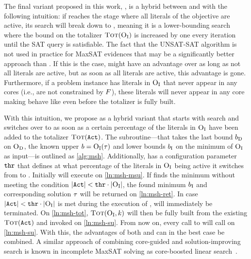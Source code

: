 The final variant proposed in this work, \msh{}, is a hybrid between \msu{} and \satunsat{} with the following intuition:
if \msu{}  reaches the stage where all literals of the objective are active, its search will break down to \unsatsat{}, meaning it is a lower-bounding search where the bound on the totalizer $\textsc{Tot}(\textsc{O}_{\text{I}})$ is increased by one every iteration until the SAT query is satisfiable.
The fact that the UNSAT-SAT algorithm is not used in practice for MaxSAT evidences that \satunsat{} may be a significantly better approach than \unsatsat{}.
If this is the case, \msu{} might have an advantage over \satunsat{} as long as not all literals are active, but as soon as all literals are active, this advantage is gone.
Furthermore, if a problem instance has literals in $\textsc{O}_{\text{I}}$ that never appear in any cores (i.e., are not constrained by $F$), these literals will never appear in any core making \msu{} behave like \unsatsat{} even before the totalizer is fully built.

With this intuition, we propose \msh{} as a hybrid variant that starts with \msu{} search and switches over to \satunsat{} as soon as a certain percentage of the literals in $\textsc{O}_{\text{I}}$ have been added to the totalizer $\textsc{Tot}(\texttt{Act})$.
The subroutine---that takes the last bound $b_{\text{D}}$ on $\textsc{O}_{\text{D}}$, the known upper $b=\textsc{O}_{\text{I}}(\tau)$ and lower bounds $b_{\text{I}}$ on the minimum of $\textsc{O}_{\text{I}}$ as input---is outlined as \cref{alg:msh}.
Additionally, \msh{} has a configuration parameter $\texttt{thr}$ that defines at what percentage of the literals in $\textsc{O}_{\text{I}}$ being active it switches from \msu{} to \satunsat{}.
Initially \msh{} will execute \msu{} on \cref{ln:msh-msu}.
If \msu{} finds the minimum without meeting the condition $|\texttt{Act}| < \texttt{thr} \cdot |\textsc{O}_{\text{I}}|$, the found minimum $b_{\text{I}}$ and corresponding solution $\tau$ will be returned on \cref{ln:msh-ret}.
In case $|\texttt{Act}| < \texttt{thr} \cdot |\textsc{O}_{\text{I}}|$ is met during the execution of \msu{}, \msu{} will immediately be terminated.
On \cref{ln:msh-tot}, $\textsc{Tot}(\textsc{O}_{\text{I}},k)$ will then be fully built from the existing $\textsc{Tot}(\texttt{Act})$ and \satunsat{} invoked on \cref{ln:msh-su}.
From now on, every call to \msh{} will call \satunsat{} on \cref{ln:msh-su}.
With this, the advantages of both \msu{} and \satunsat{} can in the best case be combined.
A similar approach of combining core-guided and solution-improving search is known in incomplete MaxSAT solving as core-boosted linear search~\autocite{DBLP:conf/cpaior/BergDS19}.

